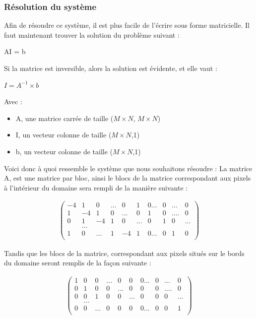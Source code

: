 \subsubsection{Résolution du système}
Afin de résoudre ce système, il est plus facile de l'écrire sous forme matricielle. Il faut maintenant trouver la solution du problème suivant : 
\begin{center}
 AI = b 
\end{center}
Si la matrice est inversible, alors la solution est évidente, et elle vaut : 
\begin{center}
$I = A^{-1}\times b$
\end{center} 
Avec : 
\begin{itemize}
\item A, une matrice carrée de taille ($M\times N$, $M\times N$)
\item I, un vecteur colonne de taille ($M\times N$,1)
\item b, un vecteur colonne de taille ($M\times N$,1)
\end{itemize}
Voici donc à quoi ressemble le système que nous souhaitons résoudre :
La matrice A, est une matrice par bloc, ainsi le blocs de la matrice correspondant aux pixels à l'intérieur du domaine sera rempli de la manière  suivante : 
\begin{center}
\begin{equation}
\left.
\begin{aligned}
\begin{pmatrix}
	-4 & 1 & 0 & ...& 0 & 1 & 0...&0& ... & 0\\
	1 & -4 & 1 & 0 & ... & 0 &1 &0&....&0\\
	0 & 1 & -4 & 1 & 0&... &0 &1 &0&...\\
	&...\\
	1 & 0 &... &1 &-4 &1 &0...& 0& 1 & 0\\
\end{pmatrix}
\end{aligned}
\right.
\end{equation}
\end{center}
Tandis que les blocs de la matrice, correspondant aux pixels situés sur le bords du domaine seront remplis de la façon suivante : 
\begin{center}
\begin{equation}
\left.
\begin{aligned}
\begin{pmatrix}
	1 & 0& 0 & ...& 0 & 0 & 0...&0& ... & 0\\
	0 & 1 & 0 & 0 & ... & 0 &0 &0&....&0\\
	0 & 0 & 1 & 0 & 0&... &0 &0 &0&...\\
	&...\\
	0 & 0 &... &0 &0 &0 &0...& 0& 0 & 1\\
\end{pmatrix}
\end{aligned}
\right.
\end{equation}
\end{center}
